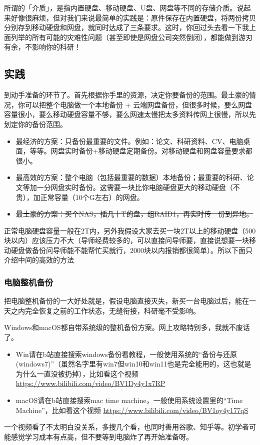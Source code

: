 所谓的「介质」，是指内置硬盘、移动硬盘、U盘、网盘等不同的存储介质。说起来好像很麻烦，但对我们来说最简单的实践是：原件保存在内置硬盘，将两份拷贝分别存到移动硬盘和网盘，就同时达成了三条要求。这时，你回过头去看一下我上面列举的所有可能的灾难性问题（甚至即使是网盘公司突然倒闭），都能做到游刃有余，不影响你的科研！

\subsection{实践}

到动手准备的环节了。首先根据你手里的资源，决定你要备份的范围。最土豪的情况，你可以把整个电脑做一个本地备份 + 云端网盘备份，但很多时候，要么网盘容量很小，要么移动硬盘容量不够，要么网速太慢把太多资料传网上很慢，所以先划定你的备份范围。

\begin{itemize}
    \item 最经济的方案：只备份最重要的文件。例如：论文、科研资料、CV、电脑桌面，等等。网盘实时备份+移动硬盘定期备份。对移动硬盘和网盘容量要求都很小。
    \item 最高效的方案：整个电脑（包括最重要的数据）本地备份；最重要的科研、论文等加一分网盘实时备份。这需要一块比你电脑硬盘更大的移动硬盘（不贵），加正常容量（10个G左右）的网盘。
    \item \sout{最土豪的方案：买个NAS，插几十T的盘，组RAID1，再实时传一份到异地。}
\end{itemize}

正常电脑硬盘容量一般在2T内，另外我假设大家去买一块2T以上的移动硬盘（500块以内）应该压力不大（导师经费较多的，可以直接问导师要，直接说想要一块移动硬盘做备份问导师能不能帮忙买就行，2000块以内报销都很简单）。所以下面只介绍中间的高效的方法

\subsubsection{电脑整机备份}
\label{sec.pc_backup}

把电脑整机备份的一大好处就是，假设电脑直接灭失，新买一台电脑过后，能在一天之内完全恢复之前的工作状态，无缝衔接，科研毫不受影响。

Windows和macOS都自带系统级的整机备份方案。网上攻略特别多，我就不废话了。
\begin{itemize}
    \item Win请在b站直接搜索windows备份看教程，一般使用系统的“备份与还原(windows7)”（虽然名字里有win7但win10和win11也是完全能用的，这也就是为什么一直没被扔掉），比如看这个视频 \url{https://www.bilibili.com/video/BV1Dy4y1x7RP}
    \item macOS请在b站直接搜索mac time machine，一般使用系统设置里的“Time Machine”，比如看这个视频 \url{https://www.bilibili.com/video/BV1oy4y177qS}
\end{itemize}
一个视频看了不太明白没关系，多搜几个看，也同时善用谷歌、知乎等。初学者可能感觉学习成本有点高，但不要等到电脑炸了再开始准备呀。

